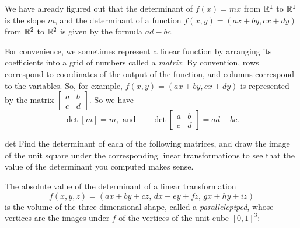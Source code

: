\documentclass{watsonbook}
\begin{document}
We have already figured out that the determinant of $f(x) = mx$ from
$\mathbb{R}^1$ to $\mathbb{R}^1$ is the slope $m$, and the determinant of a function
$f(x,y) = (ax + by, cx + dy)$ from $\mathbb{R}^2$ to $\mathbb{R}^2$ is given by the
formula $ad - bc$.

For convenience, we sometimes represent a linear function by arranging
its coefficients into a grid of numbers called a \textit{matrix}. By
convention, rows correspond to coordinates of the output of the
function, and columns correspond to the variables. So, for example,
$f(x,y) = (ax + by, cx + dy)$ is represented by the matrix
$\left[\begin{array}{cc} a & b \\ c & d \end{array}\right]$. So we
have
\[
  \det [m] = m, \text{ and} \qquad \det \left[\begin{array}{cc} a & b \\ c & d \end{array}\right] = ad - bc. 
\]

\begin{exercise}{}{det}
  Find the determinant of each of the following matrices, and draw the
  image of the unit square under the corresponding linear
  transformations to see that the value of the determinant you
  computed makes sense.

  \pairofprobs{$\left[\begin{array}{cc} 1 & 0 \\ 0 & -1 \end{array}\right]$}{
    $\left[\begin{array}{cc} 2 & 1 \\ 0 & 2 \end{array}\right]$}

  \pairofprobs{$\left[\begin{array}{cc} 0 & 1 \\ -1 & 0 \end{array}\right]$}{
    $\left[\begin{array}{cc} 2 & 1  \\ 4 & 2 \end{array}\right]$}
\end{exercise}

The absolute value of the determinant of a linear transformation 
\[
  f(x,y,z) = (ax + by + cz, \, dx + ey + fz,\, gx + hy  + iz)
\]
is the volume of the three-dimensional shape, called a
\textit{parallelepiped}, whose vertices are the images under $f$ of the
vertices of the unit cube $[0,1]^3$:
\end{document}
